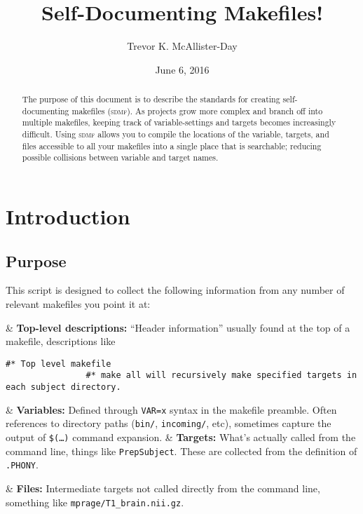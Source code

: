 \documentclass[oneside,11pt]{article}
\title{Self-Documenting Makefiles!}
\author{Trevor K. McAllister-Day}
\affil{\url{tkmday@uw.edu}}
\date{June 6, 2016}
\newcommand{\sdmf}{\textsc{sdmf}}
\begin{document}
	
	\maketitle
	
	
	\begin{abstract}
		The purpose of this document is to describe the standards for creating self-documenting makefiles (\sdmf). As projects grow more complex and branch off into multiple makefiles, keeping track of variable-settings and targets becomes increasingly difficult. Using \sdmf{} allows you to compile the locations of the variable, targets, and files accessible to all your makefiles into a single place that is searchable; reducing possible collisions between variable and target names.
	\end{abstract}
	
	\section{Introduction}
	
	\subsection{Purpose}
	
	This script is designed to collect the following information from any number of relevant makefiles you point it at:
	
	\begin{easylist}[itemize]
		& \textbf{Top-level descriptions:} ``Header information'' usually found at the top of a makefile, descriptions like
			\begin{lstlisting}[basicstyle=\ttfamily, gobble=24, breaklines=true]
				#* Top level makefile
				#* make all will recursively make specified targets in each subject directory.
			\end{lstlisting}
		& \textbf{Variables:} Defined through \texttt{VAR=x} syntax in the makefile preamble. Often references to directory paths (\texttt{bin/}, \texttt{incoming/}, etc), sometimes capture the output of \texttt{\$(\ldots)} command expansion.
		& \textbf{Targets:} What's actually called from the command line, things like \texttt{PrepSubject}. These are collected from the definition of \texttt{.PHONY}. 
			\begin{center}
			\end{center}
		& \textbf{Files:} Intermediate targets not called directly from the command line, something like \texttt{mprage/T1\_brain.nii.gz}.
	\end{easylist}
	
\end{document}
